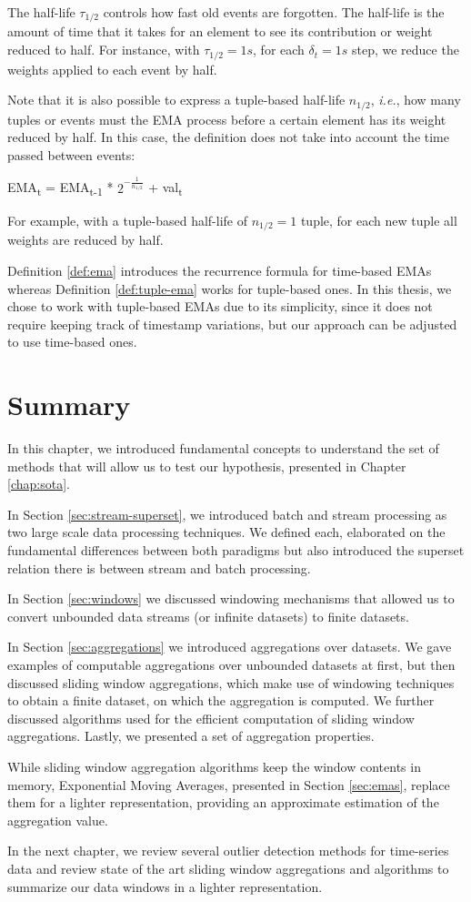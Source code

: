 The half-life $\tau_{1/2}$ controls how fast old events are forgotten. The half-life is the amount of time that it takes for an element to see its contribution or weight reduced to half. For instance, with $\tau_{1/2} = 1s$, for each $\delta_t = 1s$ step, we reduce the weights applied to each event by half. 

Note that it is also possible to express a tuple-based half-life $n_{1/2}$, \textit{i.e.}, how many tuples or events must the EMA process before a certain element has its weight reduced by half. In this case, the definition does not take into account the time passed between events:
\begin{definition}
EMA\textsubscript{t} = EMA\textsubscript{t-1} * $2^{-\frac{1}{n_{1/2}}}$ + val\textsubscript{t}
\label{def:tuple-ema}
\end{definition}
For example, with a tuple-based half-life of $n_{1/2}=1$ tuple, for each new tuple all weights are reduced by half.

Definition \ref{def:ema} introduces the recurrence formula for time-based EMAs whereas Definition \ref{def:tuple-ema} works for tuple-based ones. In this thesis, we chose to work with tuple-based EMAs due to its simplicity, since it does not require keeping track of timestamp variations, but our approach can be adjusted to use time-based ones.

\section{Summary}
In this chapter, we introduced fundamental concepts to understand the set of methods that will allow us to test our hypothesis, presented in Chapter \ref{chap:sota}.

In Section \ref{sec:stream-superset}, we introduced batch and stream processing as two large scale data processing techniques. We defined each, elaborated on the fundamental differences between both paradigms but also introduced the superset relation there is between stream and batch processing.

In Section \ref{sec:windows} we discussed windowing mechanisms that allowed us to convert unbounded data streams (or infinite datasets) to finite datasets.

In Section \ref{sec:aggregations} we introduced aggregations over datasets. We gave examples of computable aggregations over unbounded datasets at first, but then discussed sliding window aggregations, which make use of windowing techniques to obtain a finite dataset, on which the aggregation is computed. We further discussed algorithms used for the efficient computation of sliding window aggregations. Lastly, we presented a set of aggregation properties. 

While sliding window aggregation algorithms keep the window contents in memory, Exponential Moving Averages, presented in Section \ref{sec:emas}, replace them for a lighter representation, providing an approximate estimation of the aggregation value.

In the next chapter, we review several outlier detection methods for time-series data and review state of the art sliding window aggregations and algorithms to summarize our data windows in a lighter representation.